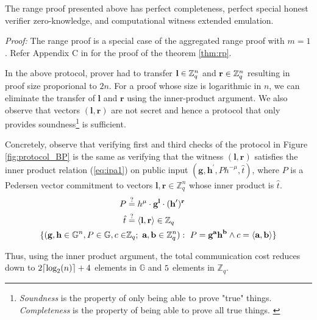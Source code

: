 \begin{theorem}
    The range proof presented above has perfect completeness, perfect special honest verifier zero-knowledge, and computational witness extended emulation.
    \label{thm:rp}
\end{theorem}
\textit{Proof:} The range proof is a special case of the aggregated range proof with $m=1$. Refer Appendix C in \cite{Bunz2018} for the proof of the theorem \ref{thm:rp}.

In the above protocol, prover had to transfer $\textbf{l} \in \mathbb{Z}_q^n$ and $\textbf{r} \in \mathbb{Z}_q^n$ resulting in proof size proporional to $2n$. 
For a proof whose size is logarithmic in $n$, we can eliminate the transfer of $\textbf{l}$ and $\textbf{r}$ using the inner-product argument. 
We also observe that vectors $(\textbf{l}, \textbf{r})$ are not secret and hence a protocol that only provides soundness\footnote{\textit{Soundness} is the property of only being able to prove "true" things. \textit{Completeness} is the property of being able to prove all true things. \cite{sc13}} is sufficient. 

Concretely, observe that verifying first and third checks of the protocol in Figure \ref{fig:protocol_BP} is the same as verifying that the witness $(\textbf{l}, \textbf{r})$ satisfies the inner product relation (\ref{eq:ipa1}) on public input $(\textbf{g}, \textbf{h}^{\prime}, Ph^{-\mu}, \hat{t})$, where $P$ is a Pedersen vector commitment to vectors $\textbf{l}, \textbf{r} \in \mathbb{Z}_q^n$ whose inner product is $\hat{t}$.
\vspace{-2mm}
\begin{align*}
        P & \stackrel{?}{=}  h^{\mu} \cdot \textbf{g}^{\textbf{l}} \cdot (\textbf{h}^{\prime})^{\textbf{r}}
        \\
        \hat{t} & \stackrel{?}{=} \langle \textbf{l},\textbf{r}\rangle \in \mathbb{Z}_q
        \\
        \vspace{2mm}
        \{ (\textbf{g}, \textbf{h} \in \mathbb{G}^n, P \in \mathbb{G}, c \in & \mathbb{Z}_q ;\ 
        \textbf{a}, \textbf{b} \in \mathbb{Z}_q^{n}) :\
        P = \textbf{g}^{\textbf{a}}\textbf{h}^{\textbf{b}} \wedge c = \langle \textbf{a}, \textbf{b} \rangle \}
    \end{align*}
    
Thus, using the inner product argument, the total communication cost reduces down to $\textcolor{black}{2\lceil \text{log}_2(n) \rceil + 4}$ elements in $\mathbb{G}$ and $\textcolor{black}{5}$ elements in $\mathbb{Z}_q$.
